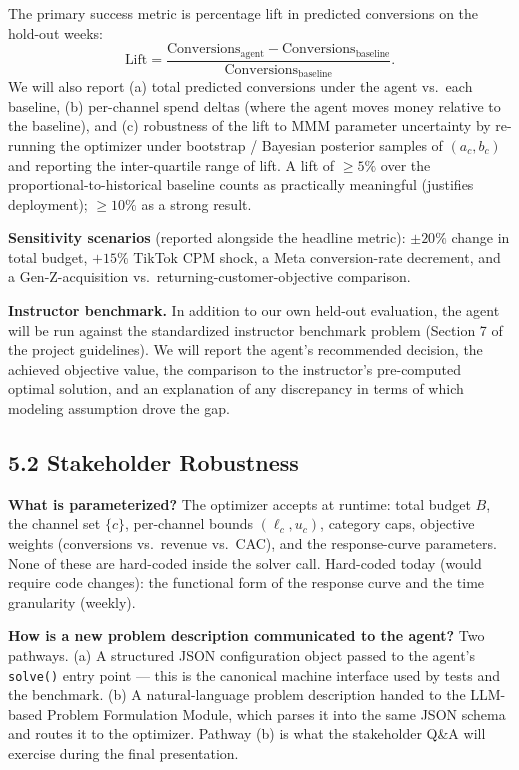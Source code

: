 \documentclass[11pt]{article}
\begin{document}
The primary success metric is percentage lift in predicted conversions on the hold-out weeks:
\[
\text{Lift} = \frac{\text{Conversions}_{\text{agent}} - \text{Conversions}_{\text{baseline}}}{\text{Conversions}_{\text{baseline}}}.
\]
We will also report (a) total predicted conversions under the agent vs.\ each baseline, (b) per-channel spend deltas (where the agent moves money relative to the baseline), and (c) robustness of the lift to MMM parameter uncertainty by re-running the optimizer under bootstrap / Bayesian posterior samples of $(a_c, b_c)$ and reporting the inter-quartile range of lift. A lift of $\ge 5\%$ over the proportional-to-historical baseline counts as practically meaningful (justifies deployment); $\ge 10\%$ as a strong result.

\textbf{Sensitivity scenarios} (reported alongside the headline metric): $\pm 20\%$ change in total budget, $+15\%$ TikTok CPM shock, a Meta conversion-rate decrement, and a Gen-Z-acquisition vs.\ returning-customer-objective comparison.

\textbf{Instructor benchmark.} In addition to our own held-out evaluation, the agent will be run against the standardized instructor benchmark problem (Section 7 of the project guidelines). We will report the agent's recommended decision, the achieved objective value, the comparison to the instructor's pre-computed optimal solution, and an explanation of any discrepancy in terms of which modeling assumption drove the gap.

\subsection*{5.2 \; Stakeholder Robustness}

\textbf{What is parameterized?} The optimizer accepts at runtime: total budget $B$, the channel set $\{c\}$, per-channel bounds $(\ell_c, u_c)$, category caps, objective weights (conversions vs.\ revenue vs.\ CAC), and the response-curve parameters. None of these are hard-coded inside the solver call. Hard-coded today (would require code changes): the functional form of the response curve and the time granularity (weekly).

\textbf{How is a new problem description communicated to the agent?} Two pathways. (a) A structured JSON configuration object passed to the agent's \texttt{solve()} entry point --- this is the canonical machine interface used by tests and the benchmark. (b) A natural-language problem description handed to the LLM-based Problem Formulation Module, which parses it into the same JSON schema and routes it to the optimizer. Pathway (b) is what the stakeholder Q\&A will exercise during the final presentation.
\end{document}
